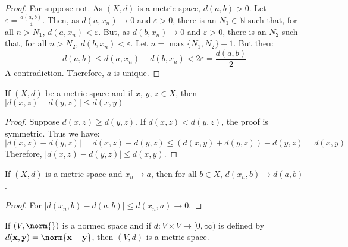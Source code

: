 \documentclass[crop=false,class=book,oneside]{standalone}
\begin{document}
            \begin{proof}
                For suppose not. As
                $(X,d)$ is a metric space, $d(a,b)>0$.
                Let $\varepsilon=\frac{d(a,b)}{4}$.
                Then, as $d(a,x_{n})\rightarrow{0}$
                and $\varepsilon>0$, there is an
                $N_{1}\in\mathbb{N}$ such that, for all
                $n>N_{1}$, $d(a,x_{n})<\varepsilon$. But,
                as $d(b,x_{n})\rightarrow{0}$ and
                $\varepsilon>0$, there is an $N_{2}$ such
                that, for all $n>N_{2}$,
                $d(b,x_{n})<\varepsilon$.
                Let $n=\max\{N_{1},N_{2}\}+1$.
                But then:
                \begin{equation*}
                    d(a,b)\leq{d(a,x_{n})+d(b,x_{n})}
                    <2\varepsilon=\frac{d(a,b)}{2}
                \end{equation*}
                A contradiction. Therefore, $a$ is unique.
            \end{proof}
            \begin{theorem}
                If $(X,d)$ be a metric space and if
                $x$, $y$, $z\in{X}$, then
                $|d(x,z)-d(y,z)|\leq{d(x,y)}$
            \end{theorem}
            \begin{proof}
                Suppose $d(x,z)\geq{d(y,z)}$.
                If $d(x,z)<d(y,z)$, the proof is
                symmetric. Thus we have:
                \begin{equation*}
                    |d(x,z)-d(y,z)|
                    =d(x,z)-d(y,z)
                    \leq{(d(x,y)+d(y,z))-d(y,z)}
                    =d(x,y)
                \end{equation*}
                Therefore,
                $|d(x,z)-d(y,z)|\leq{d(x,y)}$.
            \end{proof}
            \begin{theorem}
                If $(X,d)$ is a metric space
                and $x_{n}\rightarrow{a}$, then
                for all $b\in{X}$,
                $d(x_{n},b)\rightarrow{d(a,b)}$.
            \end{theorem}
            \begin{proof}
                For
                $|d(x_{n},b)-d(a,b)|\leq{d(x_{n},a)}%
                 \rightarrow{0}$.
            \end{proof}
            \begin{theorem}
                If $(V,\norm{})$ is a normed space
                and if $d:{V}\times{V}\rightarrow[0,\infty)$
                is defined by
                $d(\mathbf{x},\mathbf{y})%
                 =\norm{\mathbf{x}-\mathbf{y}}$,
                then $(V,d)$ is a metric space.
            \end{theorem}
\end{document}
